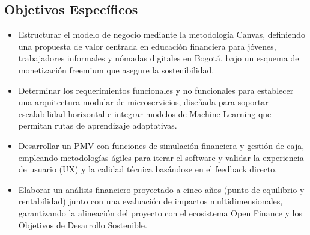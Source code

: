 {}
\subsection*{Objetivos Específicos}

\begin{itemize}
	\item Estructurar el modelo de negocio mediante la metodología Canvas, definiendo una propuesta de valor centrada en educación financiera para jóvenes, trabajadores informales y nómadas digitales en Bogotá, bajo un esquema de monetización freemium que asegure la sostenibilidad.
	
	\item Determinar los requerimientos funcionales y no funcionales para establecer una arquitectura modular de microservicios, diseñada para soportar escalabilidad horizontal e integrar modelos de Machine Learning que permitan rutas de aprendizaje adaptativas.
	
	\item Desarrollar un PMV con funciones de simulación financiera y gestión de caja, empleando metodologías ágiles para iterar el software y validar la experiencia de usuario (UX) y la calidad técnica basándose en el feedback directo.
	
	\item Elaborar un análisis financiero proyectado a cinco años (punto de equilibrio y rentabilidad) junto con una evaluación de impactos multidimensionales, garantizando la alineación del proyecto con el ecosistema Open Finance y los Objetivos de Desarrollo Sostenible.
\end{itemize}